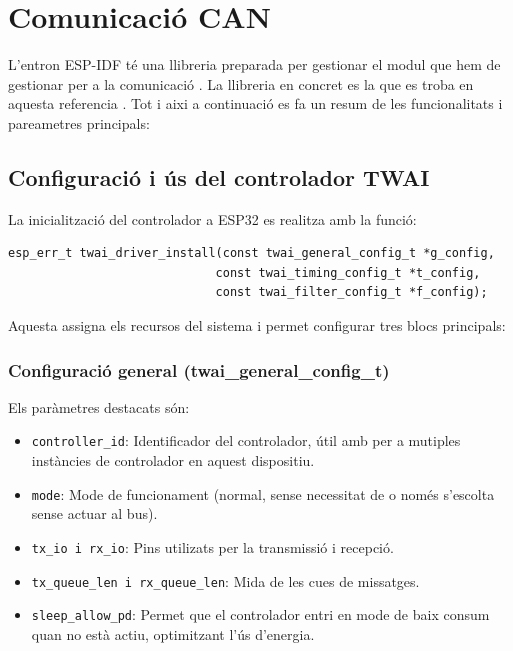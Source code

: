 \documentclass{tfgitic}[2024/07/01]
\begin{document}
\section{Comunicació CAN}

L'entron ESP-IDF té una llibreria preparada per gestionar el modul  que hem de gestionar per a la comunicació . La llibreria en concret es la que es troba en aquesta referencia 
\cite{espressif_twai}. Tot i aixi a continuació es fa un resum de les funcionalitats i pareametres principals:

\subsection{Configuració i ús del controlador TWAI}

La inicialització del controlador  a ESP32 es realitza amb la funció:

\begin{verbatim}
esp_err_t twai_driver_install(const twai_general_config_t *g_config, 
                             const twai_timing_config_t *t_config, 
                             const twai_filter_config_t *f_config);
\end{verbatim}

Aquesta assigna els recursos del sistema i permet configurar tres blocs principals:

\subsubsection{Configuració general (twai\_general\_config\_t)}

Els paràmetres destacats són:

\begin{itemize}
    \item \texttt{controller\_id}: Identificador del controlador, útil amb per a mutiples instàncies de controlador en aquest dispositiu.
    \item \texttt{mode}: Mode de funcionament (normal, sense necessitat de  o només s'escolta sense actuar al bus).
    \item \texttt{tx\_io i rx\_io}: Pins  utilizats per la transmissió i recepció.
    \item \texttt{tx\_queue\_len i rx\_queue\_len}: Mida de les cues de missatges.
    \item \texttt{sleep\_allow\_pd}: Permet que el controlador entri en mode de baix consum quan no està actiu, optimitzant l'ús d'energia.
\end{itemize}
\end{document}
